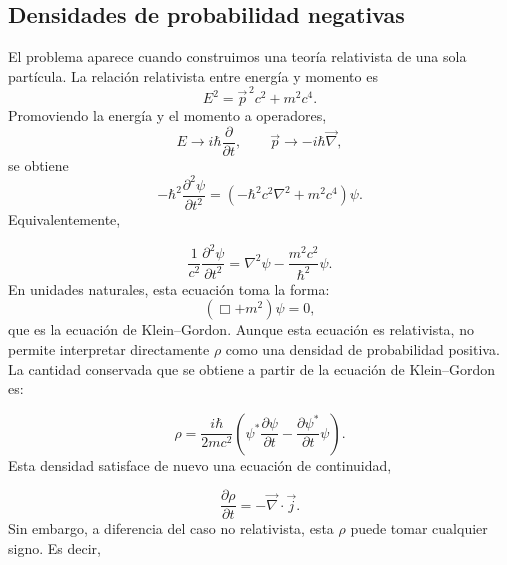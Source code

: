 \documentclass[a4paper,11pt]{book} %
\begin{document}
\subsection{Densidades de probabilidad negativas}
\noindent
El problema aparece cuando construimos una teoría relativista de una sola partícula. La relación relativista entre energía y momento es
\begin{equation}
    E^2 = \vec{p}^{\,2}c^2 + m^2c^4.
\end{equation}
\noindent
Promoviendo la energía y el momento a operadores,
\begin{equation}
    E \rightarrow i\hbar \frac{\partial}{\partial t},
    \qquad
    \vec{p} \rightarrow -i\hbar\vec{\nabla},
\end{equation}
\noindent
se obtiene
\begin{equation}
    -\hbar^2
    \frac{\partial^2 \psi}{\partial t^2}
    =
    \left(
        -\hbar^2 c^2\nabla^2
        +
        m^2c^4
    \right)\psi.
\end{equation}
\noindent
Equivalentemente,

\begin{equation}
    \frac{1}{c^2}
    \frac{\partial^2 \psi}{\partial t^2}
    =
    \nabla^2\psi
    -
    \frac{m^2c^2}{\hbar^2}\psi.
\end{equation}
\newpage\noindent
En unidades naturales, esta ecuación toma la forma:
\begin{equation}
    \left(
        \Box + m^2
    \right)\psi = 0,
\end{equation}
\noindent
que es la ecuación de Klein--Gordon.
\medskip\newline
Aunque esta ecuación es relativista, no permite interpretar directamente
\(\rho\) como una densidad de probabilidad positiva. La cantidad conservada que
se obtiene a partir de la ecuación de Klein--Gordon es:

\begin{equation}
    \rho
    =
    \frac{i\hbar}{2mc^2}
    \left(
        \psi^*\frac{\partial \psi}{\partial t}
        -
        \frac{\partial \psi^*}{\partial t}\psi
    \right).
\end{equation}
\noindent
Esta densidad satisface de nuevo una ecuación de continuidad,

\begin{equation}
    \frac{\partial \rho}{\partial t}
    =
    -\vec{\nabla}\cdot \vec{j}.
\end{equation}
\noindent
Sin embargo, a diferencia del caso no relativista, esta \(\rho\) puede tomar
cualquier signo. Es decir,
\end{document}
